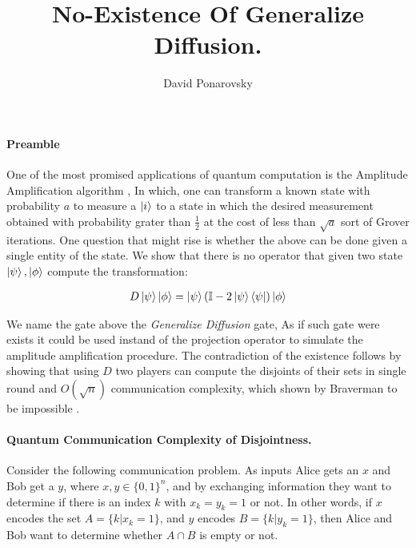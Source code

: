 \documentclass{article}
\begin{document}
\title{No-Existence Of Generalize Diffusion.}
\author{David Ponarovsky}
\maketitle
\begin{multicols*}{2}

  \paragraph{Preamble} One of the most promised applications of quantum computation is the Amplitude Amplification algorithm \cite{Brassard_2002}, In which, one can transform a known state with probability $a$ to measure a $\ket{i}$ to a state in which the desired measurement obtained with probability grater than $\frac{1}{2}$ at the cost of less than $\sqrt{a}$ sort of Grover iterations. One question that might rise is whether the above can be done given a single entity of the state. We show that there is no operator that given two state $\ket{\psi},\ket{\phi}$ compute the transformation: 
 
  
\begin{equation*}
  \begin{split}
    D \ket{\psi}\ket{\phi} = \ket{\psi}\left( \mathbb{I} - 2 \ket{\psi}\bra{\psi} \right)\ket{\phi} 
   \end{split}
\end{equation*}

We name the gate above the \textit{Generalize Diffusion} gate, As if such gate were exists it could be used instand of the projection operator to simulate the amplitude amplification procedure. The contradiction of the existence follows by showing that using $D$ two players can compute the disjoints of their sets in single round and $O\left( \sqrt{n} \right)$ communication complexity, which shown by Braverman to be impossible \cite{Braverman}.    

\paragraph{Quantum Communication Complexity of Disjointness.}
Consider the following communication problem.
As inputs Alice gets an \(x\) and Bob get a \(y\), where \(x, y \in \{0, 1\}^n \), and by exchanging information they want to determine if there is an index \(k\) with \(x_k = y_k = 1 \) or not. 
In other words, if \(x\) encodes the set \(A = \{k | x_k = 1\} \), and \(y\) encodes \(B = \{k | y_k = 1\}\), 
then Alice and Bob want to determine whether \( A \cap B \) is empty or not.


\end{multicols*}
\end{document}
